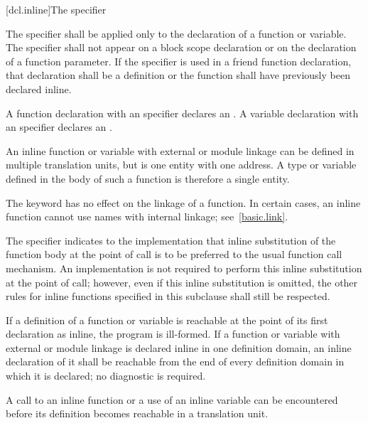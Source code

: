 [dcl.inline]{The  specifier}%

\pnum
{}%
%
%
The  specifier shall be applied only to the declaration
of a function or variable.
The  specifier shall not appear on a block scope declaration or
on the declaration of a function parameter.
If the  specifier is used in a friend function declaration, that
declaration shall be a definition or the function shall have previously
been declared inline.

\pnum
A function declaration
with an  specifier declares an
.
A variable declaration with an  specifier declares an
.
\begin{note}
An inline function or variable
with external or module linkage
can be defined in multiple translation units,
but is one entity with one address.
A type or  variable
defined in the body of such a function
is therefore a single entity.
\end{note}
\begin{note}
The  keyword has no effect on the linkage of a function.
In certain cases, an inline function cannot use names with internal linkage;
see~\ref{basic.link}.
\end{note}

\pnum
The  specifier indicates to
the implementation that inline substitution of the function body at the
point of call is to be preferred to the usual function call mechanism.
An implementation is not required to perform this inline substitution at
the point of call; however, even if this inline substitution is omitted,
the other rules for inline functions specified in this subclause shall
still be respected.

\pnum
If a definition of a function or variable is reachable
at the point of its
first declaration as inline, the program is ill-formed. If a function or variable
with external or module linkage
is declared inline in one definition domain,
an inline declaration of it shall be reachable
from the end of every definition domain in which it is declared;
no diagnostic is required.
\begin{note}
A call to an inline function or a use of an inline variable can be encountered
before its definition becomes reachable in a translation unit.
\end{note}

